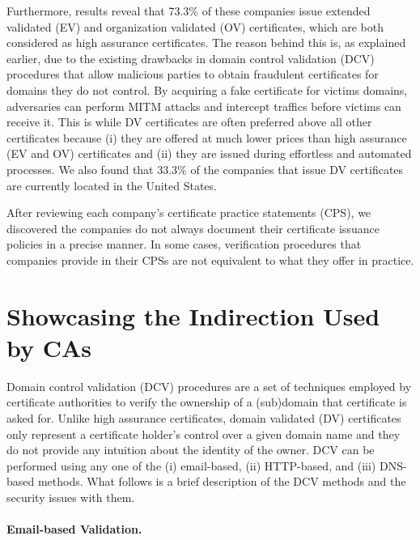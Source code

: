 Furthermore, results reveal that 73.3\% of these companies issue extended validated (EV) and organization validated (OV) certificates, which are both considered as high assurance certificates. The reason behind this is, as explained earlier, due to the existing drawbacks in domain control validation (DCV) procedures that allow malicious parties to obtain fraudulent certificates for domains they do not control. By acquiring a fake certificate for victims domains, adversaries can perform MITM attacks and intercept traffics before victims can receive it. This is while DV certificates are often preferred above all other certificates because (i) they are offered at much lower prices than high assurance (EV and OV) certificates and (ii) they are issued during effortless and automated processes. We also found that 33.3\% of the companies that issue DV certificates are currently located in the United States. 

After reviewing each company's certificate practice statements (CPS), we discovered the companies do not always document their certificate issuance policies in a precise manner. In some cases, verification procedures that companies provide in their CPSs are not equivalent to what they offer in practice.

\section{Showcasing the Indirection Used by CAs}

Domain control validation (DCV) procedures are a set of techniques employed by certificate authorities to verify the ownership of a (sub)domain that certificate is asked for. Unlike high assurance certificates, domain validated (DV) certificates only represent a certificate holder's control over a given domain name and they do not provide any intuition about the identity of the owner. DCV can be performed using any one of the (i) email-based, (ii) HTTP-based, and (iii) DNS-based methods. What follows is a brief description of the DCV methods and the security issues with them.


\paragraph{Email-based Validation.}

